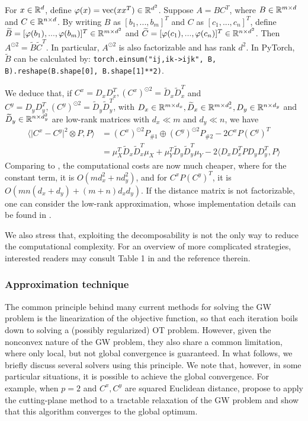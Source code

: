 \begin{lemma}
  For $x \in \mathbb R^d$, define $\varphi(x) = \text{vec}(xx^T) \in \mathbb R^{d^2}$.
  Suppose $A = B C^T$, where $B \in \mathbb R^{m \times d}$ and $C \in \mathbb R^{n \times d}$.
  By writing $B$ as $[b_1, ..., b_m]^T$ and $C$ as $[c_1, ..., c_n]^T$, define
  $\widetilde{B} = [\varphi(b_1), ..., \varphi(b_m)]^T \in \mathbb R^{m \times d^2}$ and
  $\widetilde{C} = [\varphi(c_1), ..., \varphi(c_n)]^T \in \mathbb R^{n \times d^2}$.
  Then $A^{\odot 2} = \widetilde{B} \widetilde{C}^T$. In particular, $A^{\odot 2}$ is also
  factorizable and has rank $d^2$. In PyTorch, $\widetilde{B}$ can be calculated by:
  \texttt{torch.einsum("ij,ik->ijk", B, B).reshape(B.shape[0], B.shape[1]**2)}.
\end{lemma}
We deduce that, if $C^x = D_x D_x^T, (C^x)^{\odot 2} = \widetilde{D}_x \widetilde{D}_x^T$
and $C^y = D_y D_y^T, (C^y)^{\odot 2} = \widetilde{D}_y \widetilde{D}_y^T$,
with $D_x \in \mathbb R^{m \times d_x}, \widetilde{D}_x \in \mathbb R^{m \times d_x^2},
D_y \in \mathbb R^{n \times d_y}$ and $\widetilde{D}_y \in \mathbb R^{n \times d_y^2}$ are low-rank matrices
with $d_x \ll m$ and $d_y \ll n$, we have
\begin{align}
  \langle \vert C^x - C^y \vert^2 \otimes P, P \rangle
  &= (C^x)^{\odot 2} P_{\# 1} \oplus (C^y)^{\odot 2} P_{\# 2} - 2 C^x P (C^y)^T \\
  &= \mu_X^T \widetilde{D}_x \widetilde{D}_x^T \mu_X
  + \mu_Y^T \widetilde{D}_y \widetilde{D}_y^T \mu_Y - 2 \langle D_x D_x^T P D_y D_y^T, P \rangle
\end{align}
Comparing to , the computational costs are now much cheaper,
where for the constant term, it is $O(m d_x^2 + n d_y^2)$, and for $C^x P (C^y)^T$,
it is $O(mn(d_x + d_y) + (m+n) d_x d_y)$. If the distance matrix is not factorizable,
one can consider the low-rank approximation,
whose implementation details can be found in \citep{Meyer21a}.

We also stress that, exploiting the decomposability is not the only way to reduce the computational
complexity. For an overview of more complicated strategies,
interested readers may consult Table 1 in \citep{Li23} and the reference therein.

\subsubsection{Approximation technique}
The common principle behind many current methods for solving the GW problem
is the linearization of the objective function,
so that each iteration boils down to solving a (possibly regularized)
OT problem. However, given the nonconvex nature of the GW problem, they also share
a common limitation, where only local, but not global convergence is guaranteed.
In what follows, we briefly discuss several solvers using this principle.
We note that, however, in some particular situations, it is possible to achieve the
global convergence. For example, when $p=2$ and $C^x, C^y$ are squared Euclidean distance,
\citep{Ryner23} propose to apply the cutting-plane method to a tractable relaxation of the GW problem
and show that this algorithm converges to the global optimum.

